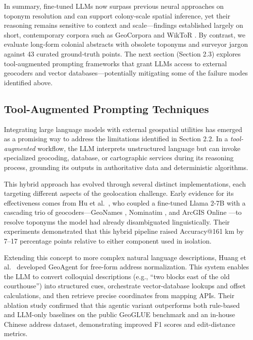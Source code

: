 In summary, fine‑tuned LLMs now surpass previous neural approaches on
toponym resolution and can support colony‑scale spatial inference, yet
their reasoning remains sensitive to context and scale---findings
established largely on short, contemporary corpora such as GeoCorpora
and WikToR \citep{wallgrun2017geocorpora, gritta2018whatsmissing}. By
contrast, we evaluate long‑form colonial abstracts with obsolete
toponyms and surveyor jargon against 43 curated ground‑truth points. The
next section (Section 2.3) explores tool‑augmented prompting frameworks
that grant LLMs access to external geocoders and vector
databases---potentially mitigating some of the failure modes identified
above.

\subsection{Tool-Augmented Prompting
Techniques}\label{tool-augmented-prompting-techniques}

Integrating large language models with external geospatial utilities has
emerged as a promising way to address the limitations identified in
Section 2.2. In a \emph{tool-augmented} workflow, the LLM interprets
unstructured language but can invoke specialized geocoding, database, or
cartographic services during its reasoning process, grounding its
outputs in authoritative data and deterministic algorithms.

This hybrid approach has evolved through several distinct
implementations, each targeting different aspects of the geolocation
challenge. Early evidence for its effectiveness comes from Hu et
al.~\citep{Hu2024_toponym_llm}, who coupled a fine-tuned Llama 2-7B with
a cascading trio of geocoders---GeoNames \citep{geonames_about},
Nominatim \citep{nominatim_project}, and ArcGIS Online
\citep{esri_arcgis_online}---to resolve toponyms the model had already
disambiguated linguistically. Their experiments demonstrated that this
hybrid pipeline raised Accuracy@161 km by 7--17 percentage points
relative to either component used in isolation.

Extending this concept to more complex natural language descriptions,
Huang et al.~\citep{Huang2024_geoagent} developed GeoAgent for free-form
address normalization. This system enables the LLM to convert colloquial
descriptions (e.g., ``two blocks east of the old courthouse'') into
structured cues, orchestrate vector-database lookups and offset
calculations, and then retrieve precise coordinates from mapping APIs.
Their ablation study confirmed that this agentic variant outperforms
both rule-based and LLM-only baselines on the public GeoGLUE benchmark
\citep{li2023geogluegeographiclanguageunderstanding} and an in-house
Chinese address dataset, demonstrating improved F1 scores and
edit-distance metrics.


